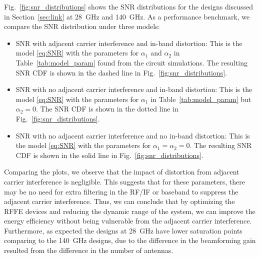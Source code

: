 
Fig.~\ref{fig:snr_distributions} shows the SNR distributions  for the designs discussed in Section~\ref{sec:link} at \SI{28}{GHz} and \SI{140}{GHz}. As a performance benchmark,
we compare the SNR distribution under three models:
\begin{itemize}
    \item SNR with adjacent carrier interference and in-band distortion:  This is the model
    \eqref{eq:SNR} with the parameters
    for $\alpha_1$ and $\alpha_2$ in
    Table~\ref{tab:model_param} found from
    the circuit simulations.  The
    resulting SNR CDF is shown
    in the dashed line in Fig.~\ref{fig:snr_distributions}.
    
    \item SNR with no adjacent carrier interference and in-band distortion:  
    This is the model
    \eqref{eq:SNR} with the parameters
    for $\alpha_1$ in
    Table~\ref{tab:model_param} but
    $\alpha_2 = 0$.  The SNR CDF is shown in the
    dotted line in Fig.~\ref{fig:snr_distributions}.
    
    \item SNR with no adjacent carrier interference and  no in-band distortion:  
    This is the model
    \eqref{eq:SNR} with the parameters
    for $\alpha_1=\alpha_2=0$.  
    The resulting SNR CDF is shown in the
    solid line in Fig.~\ref{fig:snr_distributions}.

    
\end{itemize}

Comparing the plots, we observe that the impact of distortion from adjacent carrier interference  is negligible.   This suggests that for these parameters,
there may be no need for extra filtering in the RF/IF or baseband to suppress the adjacent carrier interference.   Thus, we can conclude that by optimizing the RFFE devices and reducing the dynamic range of the system, we can improve the energy efficiency without being vulnerable from the adjacent carrier interference. Furthermore, as expected the designs at \SI{28}{GHz} have lower saturation points comparing to the \SI{140}{GHz} designs, %
due to the difference in the beamforming gain resulted from the difference in the number of antennas.

